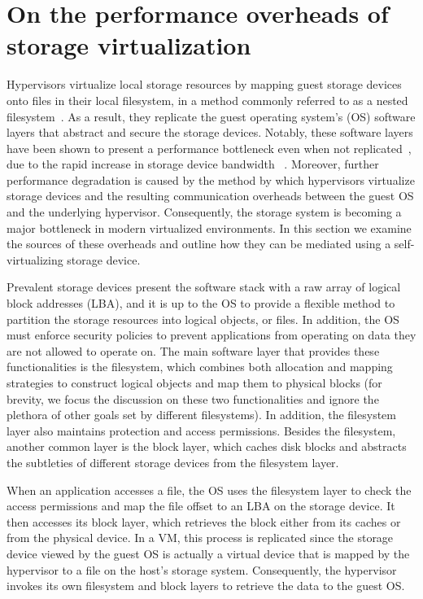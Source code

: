 \section{On the performance overheads of storage virtualization}
\label{sec:motiv}



Hypervisors virtualize local storage resources by mapping guest storage devices onto files in their local filesystem, in a method commonly referred to as a nested filesystem~\cite{le12nested}. As a result, they replicate the guest operating system's (OS) software layers that abstract and secure the storage devices. Notably, these software layers have been shown to present a performance bottleneck even when not replicated~\cite{yu14swoverheads}, due to the rapid increase in storage device bandwidth ~\cite{intel-ssd,seagate16ssd}.
%
Moreover, further performance degradation is caused by the method by which hypervisors virtualize storage devices and the resulting communication overheads between the guest OS and the underlying hypervisor.
Consequently, the storage system is becoming a major bottleneck in modern virtualized environments.
%
In this section we examine the sources of these overheads and outline how they can be mediated using a self-virtualizing storage device.

Prevalent storage devices present the software stack with a raw array of logical block addresses (LBA), and it is up to the OS to provide a flexible method to partition the storage resources into logical objects, or files. In addition, the OS must enforce security policies to prevent applications from operating on data they are not allowed to operate on.
%
The main software layer that provides these functionalities is the filesystem, which combines both allocation and mapping strategies to construct logical objects and map them to physical blocks (for brevity, we focus the discussion on these two functionalities and ignore the plethora of other goals set by different filesystems). In addition, the filesystem layer also maintains protection and access permissions. Besides the filesystem, another common layer is the block layer, which caches disk blocks and abstracts the subtleties of different storage devices from the filesystem layer.

When an application accesses a file, the OS uses the filesystem layer to check the access permissions and map the file offset to an LBA on the storage device. It then accesses its block layer, which retrieves the block either from its caches or from the physical device. In a VM, this process is replicated since the storage device viewed by the guest OS is actually a virtual device that is mapped by the hypervisor to a file on the host's storage system. Consequently, the hypervisor invokes its own filesystem and block layers to retrieve the data to the guest OS. 


